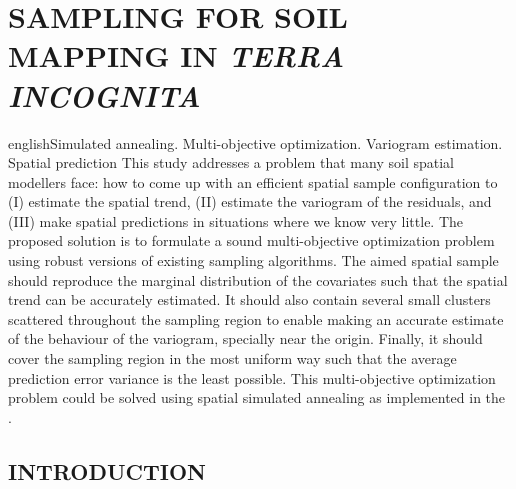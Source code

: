 \artigotrue
\chapter{SAMPLING FOR SOIL MAPPING IN \emph{TERRA INCOGNITA}}
\label{chap:chap09}


\def\enkeys{Simulated annealing. Multi-objective optimization. Variogram estimation. Spatial prediction}
  
\begin{chapterabstract}{english}{\enkeys}
This study addresses a problem that many soil spatial modellers face: how to come up with an efficient spatial 
sample configuration to (I) estimate the spatial trend, (II) estimate the variogram of the residuals, and (III) 
make spatial predictions in situations where we know very little. The proposed solution is to formulate a sound 
multi-objective optimization problem using robust versions of existing sampling algorithms. The aimed spatial 
sample should reproduce the marginal distribution of the covariates such that the spatial trend can be 
accurately estimated. It should also contain several small clusters scattered throughout the sampling region to 
enable making an accurate estimate of the behaviour of the variogram, specially near the origin. Finally, it 
should cover the sampling region in the most uniform way such that the average prediction error variance is the 
least possible. This multi-objective optimization problem could be solved using spatial simulated annealing as 
implemented in the .
\end{chapterabstract}

\formatchapter

\section{INTRODUCTION}


